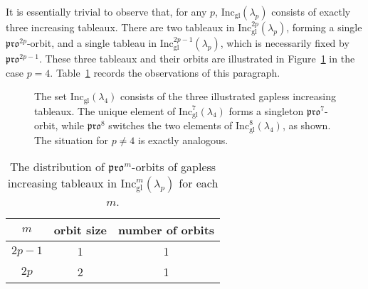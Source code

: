 \documentclass[12pt]{amsart}
\theoremstyle{definition}
\theoremstyle{remark}
\numberwithin{equation}{section}
\newcommand{\inc}{\ensuremath{\mathrm{Inc}}}
\newcommand{\incgl}{\inc_{\mathrm{gl}}}
\newcommand{\pro}{\mathfrak{pro}}
\begin{document}
It is essentially trivial to observe that, for any $p$, $\incgl(\lambda_p)$ consists of exactly three increasing tableaux. There are two tableaux in $\incgl^{2p}(\lambda_p)$, forming a single $\pro^{2p}$-orbit, and a single tableau in $\incgl^{2p-1}(\lambda_p)$, which is necessarily fixed by $\pro^{2p-1}$. These three tableaux and their orbits are illustrated in Figure~\ref{fig:propeller_orbits} in the case $p=4$. Table~\ref{tab:prop} records the observations of this paragraph.

\begin{figure}[h]
\caption{The set $\incgl(\lambda_4)$ consists of the three illustrated gapless increasing tableaux. The unique element of $\incgl^7(\lambda_4)$ forms a singleton $\pro^7$-orbit, while $\pro^8$ switches the two elements of $\incgl^8(\lambda_4)$, as shown. The situation for $p \neq 4$ is exactly analogous.}\label{fig:propeller_orbits}
\end{figure}

\begin{table}[h]
\begin{tabular}{|c|c|c|}
\hline
$m$ & orbit size & number of orbits\\
  \hline
  $2p-1$ & 1 & 1\\
  \hline
  $2p$ & 2 & 1\\ 
  \hline
\end{tabular}
\caption{The distribution of $\pro^m$-orbits of gapless increasing tableaux in $\incgl^m(\lambda_p)$ for each $m$.}
\label{tab:prop}
\end{table}
\end{document}
